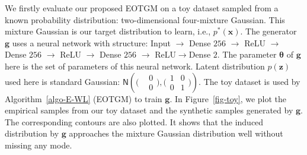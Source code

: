 {We firstly evaluate our proposed EOTGM on a toy dataset sampled from a known probability distribution: two-dimensional four-mixture Gaussian. This mixture Gaussian is our target distribution to learn, i.e., $p^{\ast}(\bm{x})$. The generator $\bm{g}$ uses a neural network with structure: Input $\rightarrow$ Dense $256$ $\rightarrow$ ReLU $\rightarrow$ Dense $256$ $\rightarrow$ ReLU $\rightarrow$ Dense $256$ $\rightarrow$ ReLU$\rightarrow$Dense $2$. The parameter $\bm{\theta} $ of $\bm{g}$ here is the set of parameters of this neural network. Latent distribution $p(\bm{z})$ used here is standard Gaussian: $\mathsf{N}\left(\bigl(\begin{smallmatrix}& 0\\
    &0\end{smallmatrix}\bigr) ,\bigl( \begin{smallmatrix}1 & 0\\ 0 &
    1\end{smallmatrix}  \bigr)\right)$.
The toy dataset is used by Algorithm~\autoref{algo-E-WL} (EOTGM) to train $\bm{g}$. In Figure~\ref{fig-toy}, we plot the empirical samples from our toy dataset and the synthetic samples generated by $\bm{g}$. The corresponding contours are also plotted. It shows that the induced distribution by $\bm{g}$ approaches the mixture Gaussian distribution well without missing any mode.}          


